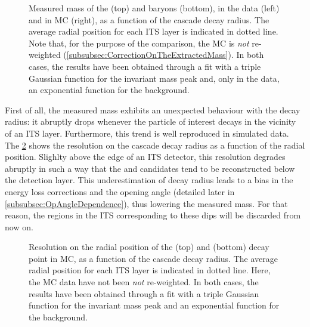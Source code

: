 \begin{figure}[h]
\hspace*{-2.cm}
\hspace*{-2.cm}
\caption{Measured mass of the \rmXi (top) and \rmOmega baryons (bottom), in the data (left) and in MC (right), as a function of the cascade decay radius. The average radial position for each ITS layer is indicated in dotted line. Note that, for the purpose of the comparison, the MC is \textit{not} re-weighted (\Sec\ref{subsubsec:CorrectionOnTheExtractedMass}). In both cases, the results have been obtained through a fit with a triple Gaussian function for the invariant mass peak and, only in the data, an exponential function for the background.}
	\label{fig:MassVsRadius}
\end{figure}

First of all, the measured mass exhibits an unexpected behaviour with the decay radius: it abruptly drops whenever the particle of interest decays in the vicinity of an ITS layer. Furthermore, this trend is well reproduced in simulated data. The \fig\ref{fig:RadiusResolVsRadius} shows the resolution on the cascade decay radius as a function of the radial position. Slighlty above the edge of an ITS detector, this resolution degrades abruptly in such a way that the \rmXi and \rmOmega candidates tend to be reconstructed below the detection layer. This underestimation of decay radius leads to a bias in the energy loss corrections and the opening angle (detailed later in \Sec\ref{subsubsec:OpAngleDependence}), thus lowering the measured mass. For that reason, the regions in the ITS corresponding to these dips will be discarded from now on.\\

\begin{figure}[t]
\hspace*{-2.cm}
\caption{Resolution on the radial position of the \rmXi (top) and \rmOmega (bottom) decay point in MC, as a function of the cascade decay radius. The average radial position for each ITS layer is indicated in dotted line. Here, the MC data have not been \textit{not} re-weighted. In both cases, the results have been obtained through a fit with a triple Gaussian function for the invariant mass peak and an exponential function for the background.}
	\label{fig:RadiusResolVsRadius}
\end{figure}

